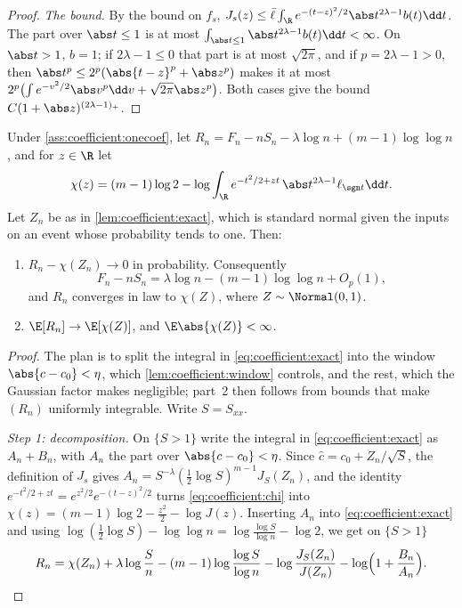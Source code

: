 \begin{refsection}
\begin{proof}
\emph{The bound.} By the bound on $f_s$, $J_s(z)\le\bar\ell\int_\R e^{-(t-z)^2/2}\abs t^{2\lambda-1}b(t)\dd t$. The part over $\abs t\le1$ is at most $\int_{\abs t\le1}\abs t^{2\lambda-1}b(t)\dd t<\infty$. On $\abs t>1$, $b=1$; if $2\lambda-1\le0$ that part is at most $\sqrt{2\pi}$, and if $p=2\lambda-1>0$, then $\abs t^p\le2^p(\abs{t-z}^p+\abs z^p)$ makes it at most $2^p\bigl(\int e^{-v^2/2}\abs v^p\dd v+\sqrt{2\pi}\abs z^p\bigr)$. Both cases give the bound $C(1+\abs z)^{(2\lambda-1)_+}$.
\end{proof}

\begin{theorem}\label{thm:coefficient:free}
Under \cref{ass:coefficient:onecoef}, let $R_n=F_n-nS_n-\lambda\log n+(m-1)\log\log n$, and for $z\in\R$ let
\begin{equation}\label{eq:coefficient:chi}
\chi(z)=(m-1)\log2-\log\int_\R e^{-t^2/2+zt}\,\abs t^{2\lambda-1}\ell_{\sgn t}\dd t.
\end{equation}
Let $Z_n$ be as in \cref{lem:coefficient:exact}, which is standard normal given the inputs on an event whose probability tends to one. Then:
\begin{enumerate}
\item $R_n-\chi(Z_n)\to0$ in probability. Consequently
\[
F_n-nS_n=\lambda\log n-(m-1)\log\log n+O_p(1),
\]
and $R_n$ converges in law to $\chi(Z)$, where $Z\sim\Normal(0,1)$.
\item $\E[R_n]\to\E[\chi(Z)]$, and $\E\abs{\chi(Z)}<\infty$.
\end{enumerate}
\end{theorem}

\begin{proof}
The plan is to split the integral in \eqref{eq:coefficient:exact} into the window $\abs{c-c_0}<\eta$, which \cref{lem:coefficient:window} controls, and the rest, which the Gaussian factor makes negligible; part~2 then follows from bounds that make $(R_n)$ uniformly integrable. Write $S=S_{xx}$.

\emph{Step 1: decomposition.} On $\{S>1\}$ write the integral in \eqref{eq:coefficient:exact} as $A_n+B_n$, with $A_n$ the part over $\abs{c-c_0}<\eta$. Since $\hat c=c_0+Z_n/\sqrt S$, the definition of $J_s$ gives $A_n=S^{-\lambda}(\frac12\log S)^{m-1}J_S(Z_n)$, and the identity $e^{-t^2/2+zt}=e^{z^2/2}e^{-(t-z)^2/2}$ turns \eqref{eq:coefficient:chi} into $\chi(z)=(m-1)\log2-\frac{z^2}2-\log J(z)$. Inserting $A_n$ into \eqref{eq:coefficient:exact} and using $\log(\frac12\log S)-\log\log n=\log\frac{\log S}{\log n}-\log2$, we get on $\{S>1\}$
\begin{equation}\label{eq:coefficient:decomp}
R_n=\chi(Z_n)+\lambda\log\frac Sn-(m-1)\log\frac{\log S}{\log n}-\log\frac{J_S(Z_n)}{J(Z_n)}-\log\Bigl(1+\frac{B_n}{A_n}\Bigr).
\end{equation}


\end{proof}
\end{refsection}
